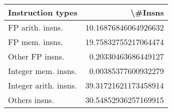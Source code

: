 \begin{tabular}{lr}
\toprule
     Instruction types &               \textbackslash \#Insns \\
\midrule
      FP arith. insns. &  10.16876846064926632 \\
        FP mem. insns. &  19.75832755217064474 \\
       Other FP insns. &   0.20330463686449127 \\
   Integer mem. insns. &   0.00385377600932279 \\
 Integer arith. insns. &  39.31721621173458914 \\
         Others insns. &  30.54852936257169915 \\
\bottomrule
\end{tabular}
